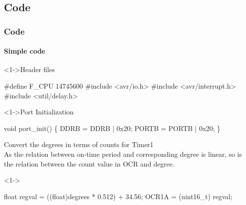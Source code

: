 \documentclass[table,10pt,red]{beamer}	%
\begin{document}
\subsection{Code}

\begin{frame}[shrink = 2,fragile]
	\frametitle{Code}
	\framesubtitle{Simple code}	
	\begin{block}<1->{Header files}	\pause
		\begin{semiverbatim}
			\scriptsize{
			#define F\_CPU 14745600
			#include <avr/io.h>
			#include <avr/interrupt.h>
			#include <util/delay.h>
			}


		\end{semiverbatim}
	\end{block} \pause
	
	\begin{block}<1->{Port Initialization}	\pause
		\begin{semiverbatim}
		void port_init()
		\{
		DDRB = DDRB | 0x20;
		PORTB = PORTB | 0x20;
		\}


		\end{semiverbatim}
	\end{block}
\end{frame}


\begin{frame}[fragile]
	Convert the degrees in terms of counts for Timer1\\
	
	
	As the relation between on-time period and corresponding degree is linear, so is the relation between the count value in OCR and degree.\\
	\begin{block}<1->{}	\pause
		\begin{semiverbatim}
		float regval = ((float)degrees * 0.512) + 34.56;
		OCR1A = (uint16\_t) regval;
		\end{semiverbatim}
	\end{block}
\end{frame}
\end{document}
